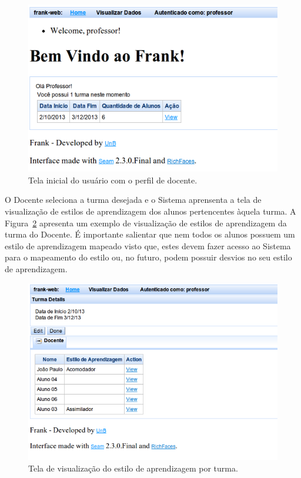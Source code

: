 \begin{figure}
	\centering
	\includegraphics[scale=0.6]{images/frank-tela-professor-acesso.png}
	\caption{Tela inicial do usuário com o perfil de docente.}
	\label{fig:frank-tela-professor-acesso}
\end{figure}

O Docente seleciona a turma desejada e o Sistema aprensenta a tela de visualização de estilos de aprendizagem dos alunos pertencentes àquela turma. A Figura~\ref{fig:frank-tela-professor-visualizar-turma} apresenta um exemplo de visualização de estilos de aprendizagem da turma do Docente. É importante salientar que nem todos os alunos possuem um estilo de aprendizagem mapeado visto que, estes devem fazer acesso ao Sistema para o mapeamento do estilo ou, no futuro, podem possuir desvios no seu estilo de aprendizagem.

\begin{figure}
	\centering
	\includegraphics[scale=0.6]{images/frank-tela-professor-visualizar-turma.png}
	\caption{Tela de visualização do estilo de aprendizagem por turma.}
	\label{fig:frank-tela-professor-visualizar-turma}
\end{figure}

